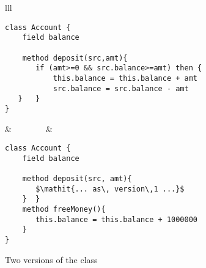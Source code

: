  \vspace*{-0.2cm}
 \begin{figure}[htb]
 \begin{tabular}{lll} %
\begin{minipage}{0.45\textwidth}
\begin{lstlisting}
class Account {
    field balance
    
    method deposit(src,amt){
       if (amt>=0 && src.balance>=amt) then {
           this.balance = this.balance + amt
           src.balance = src.balance - amt
   }   }
}
\end{lstlisting}
\end{minipage}
  &\ \ \  \ \ \ \ \  &
\begin{minipage}{0.45\textwidth}
\begin{lstlisting}
class Account {
    field balance
    
    method deposit(src, amt){
       $\mathit{... as\, version\,1 ...}$          
    }  }     
    method freeMoney(){
       this.balance = this.balance + 1000000
    }
}
\end{lstlisting}
\end{minipage} 
 \end{tabular}
  \vspace*{-0.95cm}
  \caption{Two versions of the class }
 \label{fig:ExampleBank}
 \end{figure}
 
